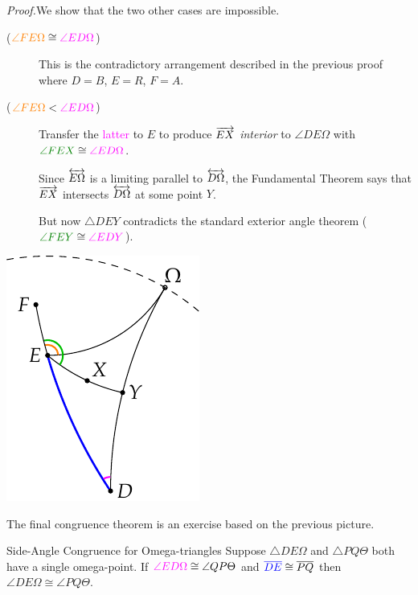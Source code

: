 \begin{tcolorbox}[proofstyle, lower separated=false, sidebyside, sidebyside align=top seam, sidebyside gap=0pt, righthand width=0.27\linewidth]
	\emph{Proof.}\quad We show that the two other cases are impossible.
	\begin{description}
	  \item[\normalfont ($\textcolor{orange}{\angle FE\Omega}\cong\textcolor{Magenta}{\angle ED\Omega}$)] This is the contradictory arrangement described in the previous proof where $D=B$, $E=R$, $F=A$.
		\item[\normalfont ($\textcolor{orange}{\angle FE\Omega}<\textcolor{Magenta}{\angle ED\Omega}$)] Transfer the \textcolor{Magenta}{latter} to $E$ to produce $\overrightarrow{EX}$ \emph{interior} to $\angle DE\Omega$ with $\textcolor{Green}{\angle FEX}\cong \textcolor{Magenta}{\angle ED\Omega}$.\par
	Since $\overleftrightarrow{E\Omega}$ is a limiting parallel to $\overleftrightarrow{D\Omega}$, the Fundamental Theorem says that $\overrightarrow{EX}$ intersects $\overleftrightarrow{D\Omega}$ at some point $Y$.\par
	But now $\triangle DEY$ contradicts the standard exterior angle theorem ($\textcolor{Green}{\angle FEY}\cong \textcolor{Magenta}{\angle EDY}$).
	\end{description}
	\tcblower
	\flushright\includegraphics[scale=0.95]{basic-ext4}\\\hfil\qedsymbol
\end{tcolorbox}

The final congruence theorem is an exercise based on the previous picture.

\begin{cor}{Side-Angle Congruence for Omega-triangles}{}
	Suppose $\triangle DE\Omega$ and $\triangle PQ\Theta$ both have a single omega-point. If $\textcolor{Magenta}{\angle ED\Omega} \cong\angle QP\Theta$ and $\textcolor{blue}{\overline{DE}}\cong\overline{PQ}$ then $\angle DE\Omega \cong\angle PQ\Theta$.
\end{cor}

